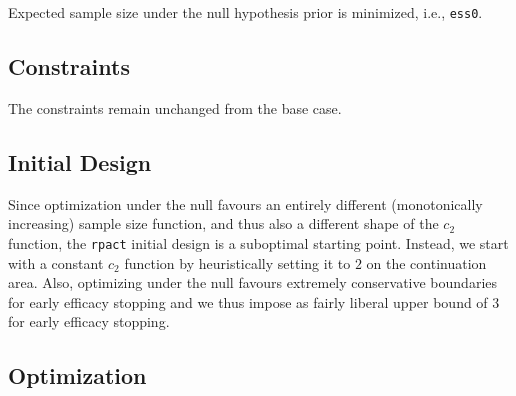 \documentclass[]{book}
\newenvironment{Shaded}{\begin{snugshade}}{\end{snugshade}}
\newcommand{\DecValTok}[1]{\textcolor[rgb]{0.00,0.00,0.81}{#1}}
\newcommand{\FloatTok}[1]{\textcolor[rgb]{0.00,0.00,0.81}{#1}}
\newcommand{\KeywordTok}[1]{\textcolor[rgb]{0.13,0.29,0.53}{\textbf{#1}}}
\newcommand{\NormalTok}[1]{#1}
\newcommand{\OperatorTok}[1]{\textcolor[rgb]{0.81,0.36,0.00}{\textbf{#1}}}
\newcommand{\StringTok}[1]{\textcolor[rgb]{0.31,0.60,0.02}{#1}}
\begin{document}
Expected sample size under the null hypothesis prior is minimized,
i.e., \texttt{ess0}.

\hypertarget{constraints-1}{%
\subsection{Constraints}\label{constraints-1}}

The constraints remain unchanged from the base case.

\hypertarget{initial-design}{%
\subsection{Initial Design}\label{initial-design}}

Since optimization under the null favours an entirely different
(monotonically increasing) sample size function,
and thus also a different shape of the \(c_2\) function,
the \texttt{rpact} initial design is a suboptimal starting point.
Instead, we start with a constant \(c_2\) function by heuristically
setting it to \(2\) on the continuation area.
Also, optimizing under the null favours extremely conservative
boundaries for early efficacy stopping and we thus impose as fairly
liberal upper bound of \(3\) for early efficacy stopping.

\begin{Shaded}
\end{Shaded}

\hypertarget{optimization-1}{%
\subsection{Optimization}\label{optimization-1}}
\end{document}

